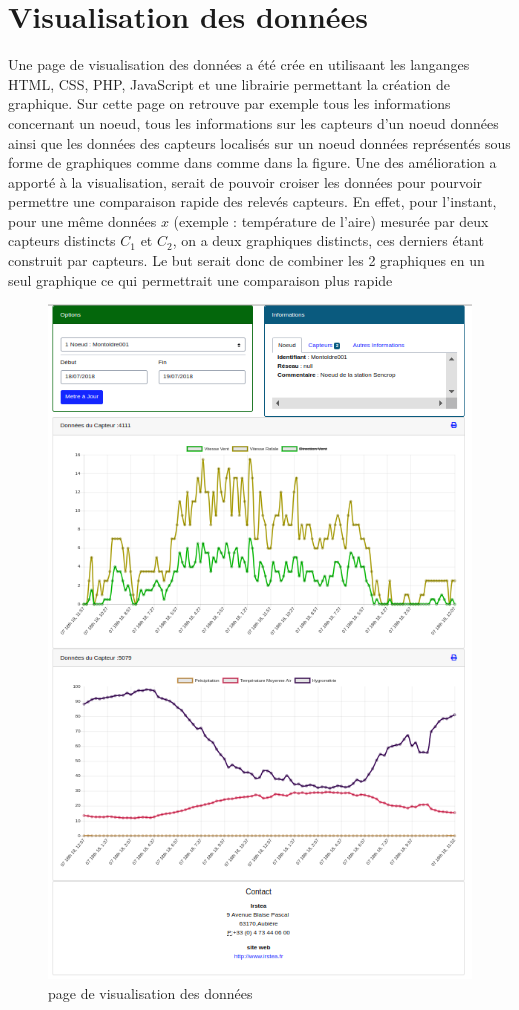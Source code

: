 \section{Visualisation des données}
Une page de visualisation des données a été crée en utilisaant les langanges HTML, CSS, PHP, JavaScript et une librairie permettant la création de graphique. Sur cette page on retrouve par exemple tous les informations concernant un noeud, tous les informations sur les capteurs d'un noeud données ainsi que les données des capteurs localisés sur un noeud données représentés sous forme de graphiques comme dans comme dans la figure.
Une des amélioration a apporté à la visualisation, serait de pouvoir croiser les données pour pourvoir permettre une comparaison rapide des relevés capteurs. En effet, pour l'instant, pour une même données \begin{math}x \end{math} (exemple : température de l'aire) mesurée par deux capteurs distincts \begin{math}C_{1}\end{math} et \begin{math}C_{2}\end{math}, on a deux graphiques distincts, ces derniers étant construit par capteurs. Le but serait donc de combiner les 2 graphiques en un seul graphique ce qui permettrait une comparaison plus rapide
\begin{figure}
    \centering
    \includegraphics[height=1\textheight]{images/db_visualisation.png}
    \caption{page de visualisation des données}
    \label{fig:page de visualisation des données}
\end{figure}


